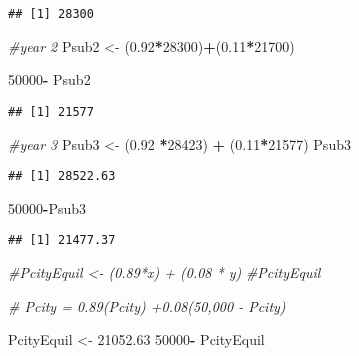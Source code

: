 \documentclass[
]{article}
\newenvironment{Shaded}{\begin{snugshade}}{\end{snugshade}}
\newcommand{\CommentTok}[1]{\textcolor[rgb]{0.56,0.35,0.01}{\textit{#1}}}
\newcommand{\DecValTok}[1]{\textcolor[rgb]{0.00,0.00,0.81}{#1}}
\newcommand{\FloatTok}[1]{\textcolor[rgb]{0.00,0.00,0.81}{#1}}
\newcommand{\NormalTok}[1]{#1}
\newcommand{\OtherTok}[1]{\textcolor[rgb]{0.56,0.35,0.01}{#1}}
\newcommand{\SpecialCharTok}[1]{\textcolor[rgb]{0.81,0.36,0.00}{\textbf{#1}}}
\begin{document}
\begin{verbatim}
## [1] 28300
\end{verbatim}

\begin{Shaded}
\begin{Highlighting}[]
\CommentTok{\#year 2}
\NormalTok{Psub2 }\OtherTok{\textless{}{-}}\NormalTok{  (}\FloatTok{0.92}\SpecialCharTok{*}\DecValTok{28300}\NormalTok{)}\SpecialCharTok{+}\NormalTok{(}\FloatTok{0.11}\SpecialCharTok{*}\DecValTok{21700}\NormalTok{)}

\DecValTok{50000}\SpecialCharTok{{-}}\NormalTok{ Psub2}
\end{Highlighting}
\end{Shaded}

\begin{verbatim}
## [1] 21577
\end{verbatim}

\begin{Shaded}
\begin{Highlighting}[]
\CommentTok{\#year 3}
\NormalTok{Psub3 }\OtherTok{\textless{}{-}}\NormalTok{ (}\FloatTok{0.92} \SpecialCharTok{*}\DecValTok{28423}\NormalTok{) }\SpecialCharTok{+}\NormalTok{ (}\FloatTok{0.11}\SpecialCharTok{*}\DecValTok{21577}\NormalTok{)}
\NormalTok{Psub3}
\end{Highlighting}
\end{Shaded}

\begin{verbatim}
## [1] 28522.63
\end{verbatim}

\begin{Shaded}
\begin{Highlighting}[]
\DecValTok{50000}\SpecialCharTok{{-}}\NormalTok{Psub3}
\end{Highlighting}
\end{Shaded}

\begin{verbatim}
## [1] 21477.37
\end{verbatim}

\begin{Shaded}
\begin{Highlighting}[]
\CommentTok{\#PcityEquil \textless{}{-} (0.89*x) + (0.08 * y)}
\CommentTok{\#PcityEquil}

\CommentTok{\# Pcity = 0.89(Pcity) +0.08(50,000 {-} Pcity)}

\NormalTok{PcityEquil }\OtherTok{\textless{}{-}} \FloatTok{21052.63}
\DecValTok{50000}\SpecialCharTok{{-}}\NormalTok{ PcityEquil}
\end{Highlighting}
\end{Shaded}
\end{document}
